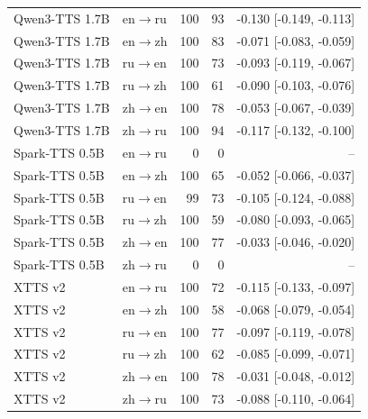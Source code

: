 \documentclass[11pt]{article}
\begin{document}
\begin{longtable}{llrrr}
Qwen3-TTS 1.7B & en$\rightarrow$ru & 100 & 93 & -0.130 [-0.149, -0.113] \\
Qwen3-TTS 1.7B & en$\rightarrow$zh & 100 & 83 & -0.071 [-0.083, -0.059] \\
Qwen3-TTS 1.7B & ru$\rightarrow$en & 100 & 73 & -0.093 [-0.119, -0.067] \\
Qwen3-TTS 1.7B & ru$\rightarrow$zh & 100 & 61 & -0.090 [-0.103, -0.076] \\
Qwen3-TTS 1.7B & zh$\rightarrow$en & 100 & 78 & -0.053 [-0.067, -0.039] \\
Qwen3-TTS 1.7B & zh$\rightarrow$ru & 100 & 94 & -0.117 [-0.132, -0.100] \\
Spark-TTS 0.5B & en$\rightarrow$ru & 0 & 0 & -- \\
Spark-TTS 0.5B & en$\rightarrow$zh & 100 & 65 & -0.052 [-0.066, -0.037] \\
Spark-TTS 0.5B & ru$\rightarrow$en & 99 & 73 & -0.105 [-0.124, -0.088] \\
Spark-TTS 0.5B & ru$\rightarrow$zh & 100 & 59 & -0.080 [-0.093, -0.065] \\
Spark-TTS 0.5B & zh$\rightarrow$en & 100 & 77 & -0.033 [-0.046, -0.020] \\
Spark-TTS 0.5B & zh$\rightarrow$ru & 0 & 0 & -- \\
XTTS v2 & en$\rightarrow$ru & 100 & 72 & -0.115 [-0.133, -0.097] \\
XTTS v2 & en$\rightarrow$zh & 100 & 58 & -0.068 [-0.079, -0.054] \\
XTTS v2 & ru$\rightarrow$en & 100 & 77 & -0.097 [-0.119, -0.078] \\
XTTS v2 & ru$\rightarrow$zh & 100 & 62 & -0.085 [-0.099, -0.071] \\
XTTS v2 & zh$\rightarrow$en & 100 & 78 & -0.031 [-0.048, -0.012] \\
XTTS v2 & zh$\rightarrow$ru & 100 & 73 & -0.088 [-0.110, -0.064] \\
\bottomrule
\end{longtable}



\end{document}
